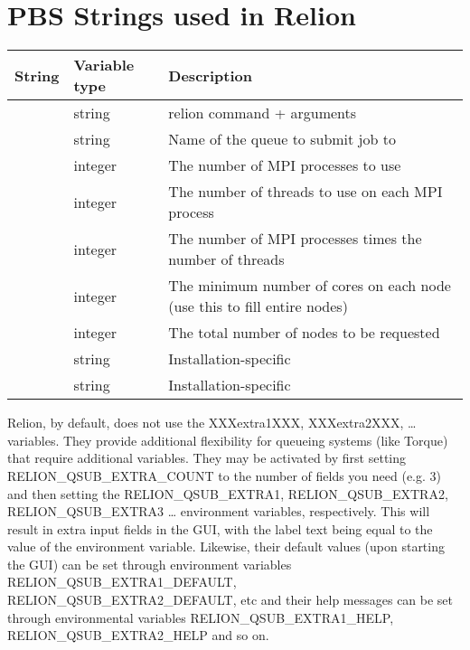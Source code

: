 \documentclass[letterpaper,10pt,english]{sphinxmanual}
\begin{document}
\section{PBS Strings used in Relion}
\label{\detokenize{relion:pbs-strings-used-in-relion}}

\begin{savenotes}\sphinxattablestart
\centering
{}
\sphinxthecaptionisattop
{}\label{\detokenize{relion:id2}}
\sphinxaftertopcaption
\begin{tabulary}{\linewidth}[t]{|T|T|T|}
\hline

String
&
Variable type
&
Description
\\
\hline
{}
&
string
&
relion command + arguments
\\
\hline
{}
&
string
&
Name of the queue to submit job to
\\
\hline
{}
&
integer
&
The number of MPI processes to use
\\
\hline
{}
&
integer
&
The number of threads to use on each MPI process
\\
\hline
{}
&
integer
&
The number of MPI processes times the number of threads
\\
\hline
{}
&
integer
&
The minimum number of cores on each node
(use this to fill entire nodes)
\\
\hline
{}
&
integer
&
The total number of nodes to be requested
\\
\hline
{}
&
string
&
Installation-specific
\\
\hline
{}
&
string
&
Installation-specific
\\
\hline
\end{tabulary}
\par
\sphinxattableend\end{savenotes}

Relion, by default, does not use the XXXextra1XXX, XXXextra2XXX, … variables.
They provide additional flexibility for queueing systems (like Torque) that require additional variables.
They may be activated by first setting RELION\_QSUB\_EXTRA\_COUNT to the number of fields you need (e.g. 3) and then setting the RELION\_QSUB\_EXTRA1, RELION\_QSUB\_EXTRA2, RELION\_QSUB\_EXTRA3 … environment variables, respectively.
This will result in extra input fields in the GUI, with the label text being equal to the value of the environment variable. Likewise, their default values (upon starting the GUI) can be set through environment variables RELION\_QSUB\_EXTRA1\_DEFAULT, RELION\_QSUB\_EXTRA2\_DEFAULT, etc and their help messages can be set through environmental variables RELION\_QSUB\_EXTRA1\_HELP, RELION\_QSUB\_EXTRA2\_HELP and so on.
\end{document}
